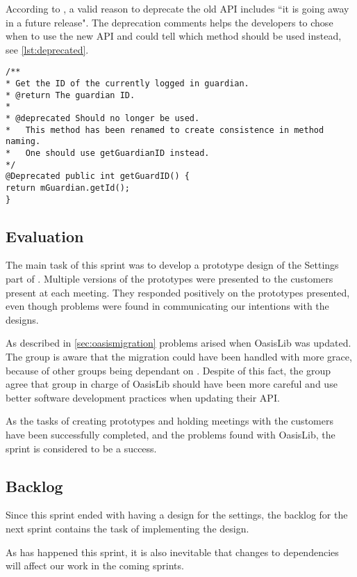 According to \citet{deprecatedreference}, a valid reason to deprecate the old API includes ``it is going away in a future release". The deprecation comments helps the developers to chose when to use the new API and could tell which method should be used instead, see \cref{lst:deprecated}.

\begin{lstlisting}[caption={Example of a deprecated method could look like this.}, label={lst:deprecated}]
/**
* Get the ID of the currently logged in guardian.
* @return The guardian ID.
* 
* @deprecated Should no longer be used.
* 	This method has been renamed to create consistence in method naming.
*	One should use getGuardianID instead.
*/
@Deprecated public int getGuardID() {
return mGuardian.getId();
}
\end{lstlisting}

\subsection{Evaluation}
The main task of this sprint was to develop a prototype design of the Settings part of \launcher.
Multiple versions of the prototypes were presented to the customers present at each meeting.
They responded positively on the prototypes presented, even though problems were found in communicating our intentions with the designs.

As described in \cref{sec:oasismigration} problems arised when OasisLib was updated.
The group is aware that the migration could have been handled with more grace, because of other groups being dependant on \launcher.
Despite of this fact, the group agree that group in charge of OasisLib should have been more careful and use better software development practices when updating their API.

As the tasks of creating prototypes and holding meetings with the customers have been successfully completed, and the problems found with OasisLib, the sprint is considered to be a success.

\subsection{Backlog}
Since this sprint ended with having a design for the settings, the backlog for the next sprint contains the task of implementing the design.

As has happened this sprint, it is also inevitable that changes to dependencies will affect our work in the coming sprints.